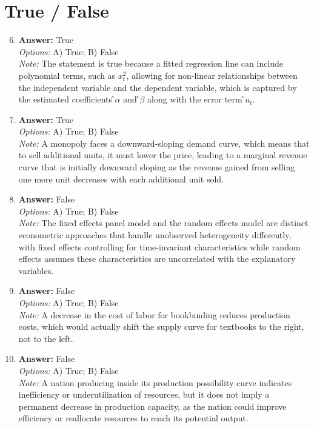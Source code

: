 \documentclass[12pt]{article}
\begin{document}
\section*{True / False}
\begin{enumerate}[label=\arabic*.]
\setcounter{enumi}{5}
\item \textbf{Answer:} True
\\ \textit{Options:} A) True; B) False
\\ \textit{Note:} The statement is true because a fitted regression line can include polynomial terms, such as \(x_t^2\), allowing for non-linear relationships between the independent variable and the dependent variable, which is captured by the estimated coefficients \(̂α\) and \(̂β\) along with the error term \(̂u_t\).
\item \textbf{Answer:} True
\\ \textit{Options:} A) True; B) False
\\ \textit{Note:} A monopoly faces a downward-sloping demand curve, which means that to sell additional units, it must lower the price, leading to a marginal revenue curve that is initially downward sloping as the revenue gained from selling one more unit decreases with each additional unit sold.
\item \textbf{Answer:} False
\\ \textit{Options:} A) True; B) False
\\ \textit{Note:} The fixed effects panel model and the random effects model are distinct econometric approaches that handle unobserved heterogeneity differently, with fixed effects controlling for time-invariant characteristics while random effects assumes these characteristics are uncorrelated with the explanatory variables.
\item \textbf{Answer:} False
\\ \textit{Options:} A) True; B) False
\\ \textit{Note:} A decrease in the cost of labor for bookbinding reduces production costs, which would actually shift the supply curve for textbooks to the right, not to the left.
\item \textbf{Answer:} False
\\ \textit{Options:} A) True; B) False
\\ \textit{Note:} A nation producing inside its production possibility curve indicates inefficiency or underutilization of resources, but it does not imply a permanent decrease in production capacity, as the nation could improve efficiency or reallocate resources to reach its potential output.
\end{enumerate}
\end{document}
